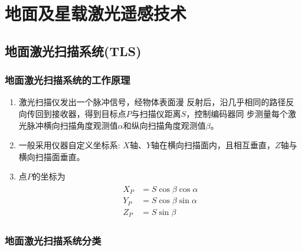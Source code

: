 
\chapter{地面及星载激光遥感技术}
\section{地面激光扫描系统(TLS)}

\subsection{地面激光扫描系统的工作原理}
\begin{enumerate}
	\item 激光扫描仪发出一个脉冲信号，经物体表面漫
		反射后，沿几乎相同的路径反向传回到接收器，得到目标点$ P $与扫描仪距离$ S $，控制编码器同
		步测量每个激光脉冲横向扫描角度观测值$ α $和纵向扫描角度观测值$ β $。
	\item 一般采用仪器自定义坐标系: $ X $轴、$ Y $轴在横向扫描面内，且相互垂直，$ Z $轴与横向扫描面垂直。
	\item 点$ P $的坐标为
		\begin{align}
			\begin{split}
			X_P & = S \cos \beta \cos \alpha \\
			Y_P & = S \cos \beta \sin \alpha \\
			Z_P & = S \sin \beta
			\end{split}
		\end{align}
\end{enumerate}

\subsection{地面激光扫描系统分类}

